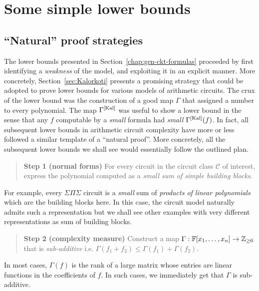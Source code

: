 \chapter{Some simple lower bounds}\label{chap:simpleLBs}


\section{``Natural'' proof strategies}\label{sec:roadmap}

The lower bounds presented in Section~\ref{chap:gen-ckt-formulas} proceeded by first identifying a \emph{weakness} of the model, and exploiting it in an explicit manner. More concretely, Section~\ref{sec:Kalorkoti} presents a promising strategy that could be adopted to prove lower bounds for various models of arithmetic circuits. The crux of the lower bound was the construction of a good map $\Gamma$ that assigned a number to every polynomial. The map $\Gamma^{\mathrm{[Kal]}}$ was useful to show a lower bound in the sense that any $f$ computable by a \emph{small} formula had \emph{small} $\Gamma^{\mathrm{[Kal]}}(f)$. In fact, all subsequent lower bounds in arithmetic circuit complexity have more or less followed a similar template of a ``natural proof''. More concretely, all the subsequent lower bounds we shall see would essentially follow the outlined plan.  

\begin{quote}
{\bf Step 1 (normal forms)} For every circuit in the circuit class $\mathcal{C}$ of interest, express the polynomial computed as a \emph{small sum of simple building blocks}. 
\end{quote}

For example, every $\Sigma\Pi\Sigma$ circuit is a \emph{small} sum of \emph{products of linear polynomials} which are the building blocks here. In this case, the circuit model naturally admits such a representation but we shall see other examples with very different representations as sum of building blocks. 

\begin{quote}
{\bf Step 2 (complexity measure)} Construct a map $\Gamma: \mathbb{F}[x_1,\dots, x_n] \rightarrow \mathbb{Z}_{\geq 0}$ that is \emph{sub-additive} i.e. $\Gamma(f_1 + f_2)\leq \Gamma(f_1) + \Gamma(f_2)$.
\end{quote}

In most cases, $\Gamma(f)$ is the rank of a large matrix whose entries are linear functions in the coefficients of $f$. In such cases, we immediately get that $\Gamma$ is sub-additive. 


